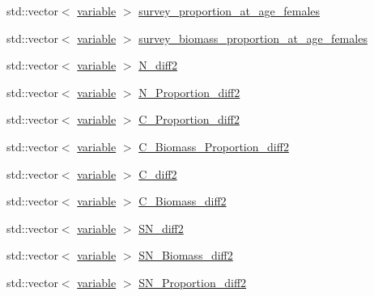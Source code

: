 \begin{DoxyCompactItemize}
std\-::vector$<$ \hyperlink{structmas_1_1_area_a3fb53ebc27c5323de15a81fbfbc7c878}{variable} $>$ \hyperlink{structmas_1_1_area_a58a763df34868ff121faabd55c2f9741}{survey\-\_\-proportion\-\_\-at\-\_\-age\-\_\-females}
\item 
std\-::vector$<$ \hyperlink{structmas_1_1_area_a3fb53ebc27c5323de15a81fbfbc7c878}{variable} $>$ \hyperlink{structmas_1_1_area_a0f91784fa56884376c4ee3d8a2fc0ec3}{survey\-\_\-biomass\-\_\-proportion\-\_\-at\-\_\-age\-\_\-females}
\item 
std\-::vector$<$ \hyperlink{structmas_1_1_area_a3fb53ebc27c5323de15a81fbfbc7c878}{variable} $>$ \hyperlink{structmas_1_1_area_a3489f1ad9f89aa85559a05457afb40c5}{N\-\_\-diff2}
\item 
std\-::vector$<$ \hyperlink{structmas_1_1_area_a3fb53ebc27c5323de15a81fbfbc7c878}{variable} $>$ \hyperlink{structmas_1_1_area_aed10a818480665caf15bb1c8ad84150d}{N\-\_\-\-Proportion\-\_\-diff2}
\item 
std\-::vector$<$ \hyperlink{structmas_1_1_area_a3fb53ebc27c5323de15a81fbfbc7c878}{variable} $>$ \hyperlink{structmas_1_1_area_a3f51d606be9b45fe96667507434dc690}{C\-\_\-\-Proportion\-\_\-diff2}
\item 
std\-::vector$<$ \hyperlink{structmas_1_1_area_a3fb53ebc27c5323de15a81fbfbc7c878}{variable} $>$ \hyperlink{structmas_1_1_area_ad0afc58b6fcbd08ddceaa9f1db430bdd}{C\-\_\-\-Biomass\-\_\-\-Proportion\-\_\-diff2}
\item 
std\-::vector$<$ \hyperlink{structmas_1_1_area_a3fb53ebc27c5323de15a81fbfbc7c878}{variable} $>$ \hyperlink{structmas_1_1_area_a0144a4142a67be22d63290f836eb3961}{C\-\_\-diff2}
\item 
std\-::vector$<$ \hyperlink{structmas_1_1_area_a3fb53ebc27c5323de15a81fbfbc7c878}{variable} $>$ \hyperlink{structmas_1_1_area_a48db0d88a1d19d6e6a43fef8c9a2ab0a}{C\-\_\-\-Biomass\-\_\-diff2}
\item 
std\-::vector$<$ \hyperlink{structmas_1_1_area_a3fb53ebc27c5323de15a81fbfbc7c878}{variable} $>$ \hyperlink{structmas_1_1_area_a3107466153d6d6c2970e3666266eb02a}{S\-N\-\_\-diff2}
\item 
std\-::vector$<$ \hyperlink{structmas_1_1_area_a3fb53ebc27c5323de15a81fbfbc7c878}{variable} $>$ \hyperlink{structmas_1_1_area_aea96de5bbac44de13b5e79a75a270cbd}{S\-N\-\_\-\-Biomass\-\_\-diff2}
\item 
std\-::vector$<$ \hyperlink{structmas_1_1_area_a3fb53ebc27c5323de15a81fbfbc7c878}{variable} $>$ \hyperlink{structmas_1_1_area_a0266b0fefd2b239bd153bd224081011c}{S\-N\-\_\-\-Proportion\-\_\-diff2}

\end{DoxyCompactItemize}
